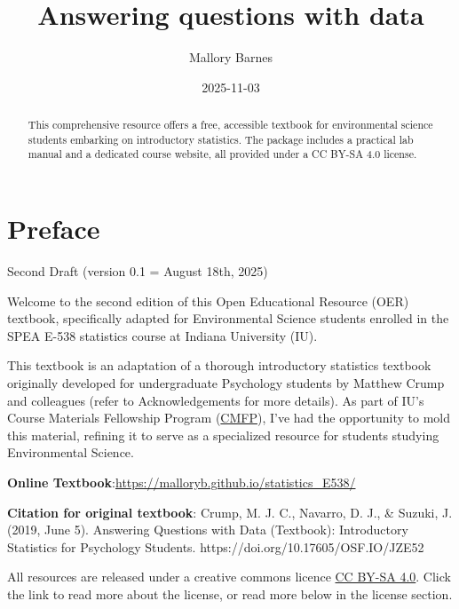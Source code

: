 \documentclass[
  letterpaper,
  DIV=11,
  numbers=noendperiod]{scrreprt}
\title{Answering questions with data}
\author{Mallory Barnes}
\date{2025-11-03}
\renewcommand*\contentsname{Table of contents}
\newcommand\contentsname{Table of contents}
\begin{document}
\maketitle
\begin{abstract}
This comprehensive resource offers a free, accessible textbook for
environmental science students embarking on introductory statistics. The
package includes a practical lab manual and a dedicated course website,
all provided under a CC BY-SA 4.0 license.
\end{abstract}

\renewcommand*\contentsname{Table of contents}
{
\hypersetup{linkcolor=}
\setcounter{tocdepth}{2}
\tableofcontents
}


\chapter*{Preface}\label{preface}


Second Draft (version 0.1 = August 18th, 2025)

Welcome to the second edition of this Open Educational Resource (OER)
textbook, specifically adapted for Environmental Science students
enrolled in the SPEA E-538 statistics course at Indiana University (IU).

This textbook is an adaptation of a thorough introductory statistics
textbook originally developed for undergraduate Psychology students by
Matthew Crump and colleagues (refer to Acknowledgements for more
details). As part of IU's Course Materials Fellowship Program
(\href{https://libraries.indiana.edu/course-material-fellowship-program-1}{CMFP}),
I've had the opportunity to mold this material, refining it to serve as
a specialized resource for students studying Environmental Science.

\textbf{Online
Textbook}:\url{https://malloryb.github.io/statistics_E538/}

\textbf{Citation for original textbook}: Crump, M. J. C., Navarro, D.
J., \& Suzuki, J. (2019, June 5). Answering Questions with Data
(Textbook): Introductory Statistics for Psychology Students.
https://doi.org/10.17605/OSF.IO/JZE52

All resources are released under a creative commons licence
\href{https://creativecommons.org/licenses/by-sa/4.0/}{CC BY-SA 4.0}.
Click the link to read more about the license, or read more below in the
license section.
\end{document}
